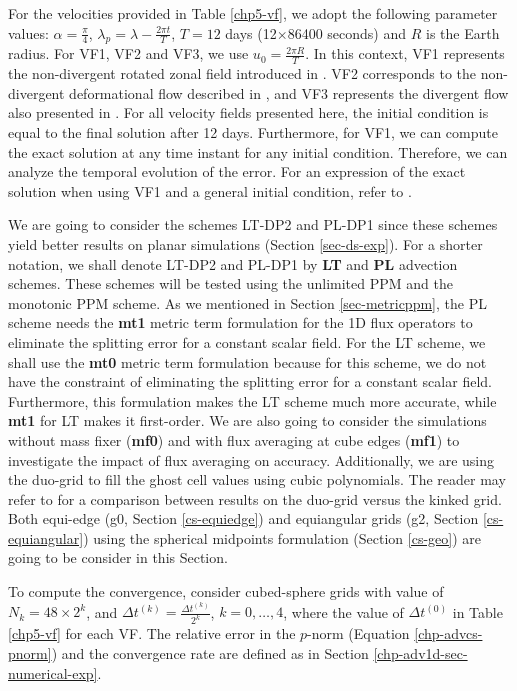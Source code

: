 For the velocities provided in Table \ref{chp5-vf}, we adopt the following parameter values: 
$\alpha=\frac{\pi}{4}$, $\lambda_p=\lambda-\frac{2\pi t}{T}$, $T=12$ days (12$\times$86400 seconds) and $R$ is the Earth radius.
For VF1, VF2 and VF3, we use $u_0 = \frac{2\pi R}{T}$.
In this context, VF1 represents the non-divergent rotated zonal field introduced in \citet{will:1992}.
VF2 corresponds to the non-divergent deformational flow described in \citet{nair:2010},
and VF3 represents the divergent flow also presented in \citet{nair:2010}.
For all velocity fields presented here, the initial condition is equal to the final solution after 12 days.
Furthermore, for VF1, we can compute the exact solution at any time instant for any initial condition.
Therefore, we can analyze the temporal evolution of the error.
For an expression of the exact solution when using VF1 and a general initial condition, refer to \citet[Theorem 5.1, p. 155]{brachet:2018}.

We are going to consider the schemes LT-DP2 and PL-DP1 since these schemes yield better results on planar simulations (Section \ref{sec-ds-exp}).
For a shorter notation, we shall denote LT-DP2 and PL-DP1 by \textbf{LT} and \textbf{PL} advection schemes. 
These schemes will be tested using the unlimited PPM  and the monotonic PPM scheme.
As we mentioned in Section \ref{sec-metricppm}, the PL scheme needs the \textbf{mt1} 
metric term formulation for the 1D flux operators to eliminate the splitting error for a constant scalar field.
For the LT scheme, we shall use the \textbf{mt0} metric term formulation because for this scheme, 
we do not have the constraint of eliminating the splitting error for a constant scalar field. 
Furthermore, this formulation makes the LT scheme much more accurate, while \textbf{mt1} for LT makes it first-order.
We are also going to consider the simulations without mass fixer (\textbf{mf0}) and with flux averaging at
cube edges (\textbf{mf1}) to investigate the impact of flux averaging on accuracy.
Additionally, we are using the duo-grid to fill the ghost cell values using cubic polynomials.
The reader may refer to \citet{mouallem:2023} for a comparison between results on the duo-grid versus the kinked grid.
Both equi-edge (g0, Section \ref{cs-equiedge}) and equiangular grids (g2, Section \ref{cs-equiangular})
using the spherical midpoints formulation (Section \ref{cs-geo}) are going to be consider in this Section.

To compute the convergence, consider cubed-sphere grids with value of $N_k =  48\times2^{k}$,
and $\Delta t^{(k)} = \frac{\Delta t^{(k)}}{2^k}$, $k=0, \ldots, 4$, where
the value of $\Delta t^{(0)}$ in Table \ref{chp5-vf} for each VF.
The relative error in the $p$-norm (Equation \eqref{chp-advcs-pnorm})
and the convergence rate are defined as in Section \ref{chp-adv1d-sec-numerical-exp}.


